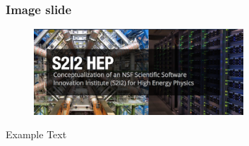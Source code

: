 \begin{frame}
\frametitle{Image slide}

\begin{figure}[htbp]
\begin{center}
\includegraphics[width=0.7\textwidth]{images/s2i2-hep.png}
\end{center}
\end{figure}

\small{Example Text}

\end{frame}


